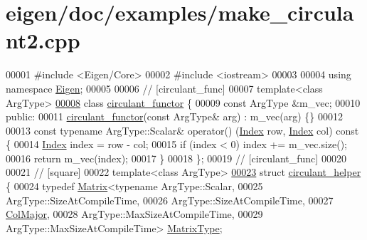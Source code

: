 \hypertarget{eigen_2doc_2examples_2make__circulant2_8cpp_source}{}\section{eigen/doc/examples/make\+\_\+circulant2.cpp}
\label{eigen_2doc_2examples_2make__circulant2_8cpp_source}

\begin{DoxyCode}
00001 \textcolor{preprocessor}{#include <Eigen/Core>}
00002 \textcolor{preprocessor}{#include <iostream>}
00003 
00004 \textcolor{keyword}{using namespace }\hyperlink{namespace_eigen}{Eigen};
00005 
00006 \textcolor{comment}{// [circulant\_func]}
00007 \textcolor{keyword}{template}<\textcolor{keyword}{class} ArgType>
\hyperlink{classcirculant__functor}{00008} \textcolor{keyword}{class }\hyperlink{classcirculant__functor}{circulant\_functor} \{
00009   \textcolor{keyword}{const} ArgType &m\_vec;
00010 \textcolor{keyword}{public}:
00011   \hyperlink{classcirculant__functor}{circulant\_functor}(\textcolor{keyword}{const} ArgType& arg) : m\_vec(arg) \{\}
00012 
00013   \textcolor{keyword}{const} \textcolor{keyword}{typename} ArgType::Scalar& operator() (\hyperlink{namespace_eigen_a62e77e0933482dafde8fe197d9a2cfde}{Index} row, \hyperlink{namespace_eigen_a62e77e0933482dafde8fe197d9a2cfde}{Index} col)\textcolor{keyword}{ const }\{
00014     \hyperlink{namespace_eigen_a62e77e0933482dafde8fe197d9a2cfde}{Index} index = row - col;
00015     \textcolor{keywordflow}{if} (index < 0) index += m\_vec.size();
00016     \textcolor{keywordflow}{return} m\_vec(index);
00017   \}
00018 \};
00019 \textcolor{comment}{// [circulant\_func]}
00020 
00021 \textcolor{comment}{// [square]}
00022 \textcolor{keyword}{template}<\textcolor{keyword}{class} ArgType>
\hyperlink{structcirculant__helper}{00023} \textcolor{keyword}{struct }\hyperlink{structcirculant__helper}{circulant\_helper} \{
00024   \textcolor{keyword}{typedef} \hyperlink{group___core___module_class_eigen_1_1_matrix}{Matrix}<\textcolor{keyword}{typename} ArgType::Scalar,
00025                  ArgType::SizeAtCompileTime,
00026                  ArgType::SizeAtCompileTime,
00027                  \hyperlink{group__enums_ggaacded1a18ae58b0f554751f6cdf9eb13a0cbd4bdd0abcfc0224c5fcb5e4f6669a}{ColMajor},
00028                  ArgType::MaxSizeAtCompileTime,
00029                  ArgType::MaxSizeAtCompileTime> \hyperlink{group___core___module_class_eigen_1_1_matrix}{MatrixType};

\end{DoxyCode}
